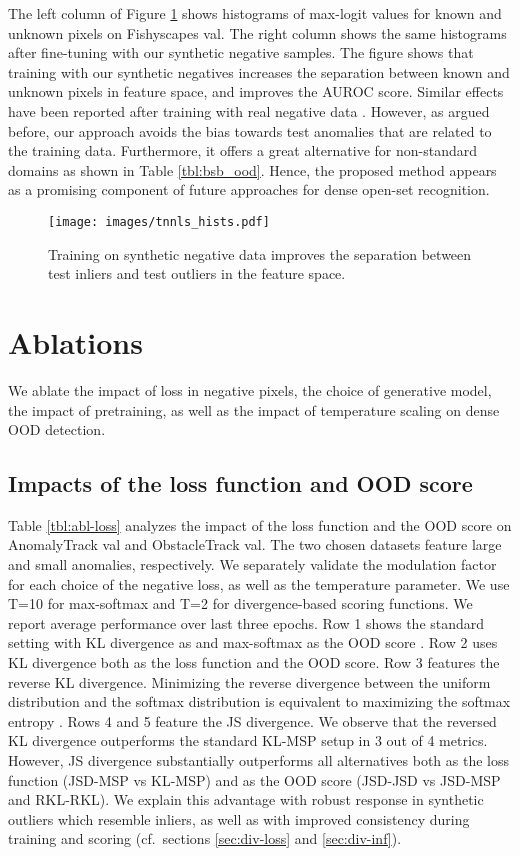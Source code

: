 \documentclass[lettersize,journal,hidelinks]{IEEEtran}
\begin{document}
The left column of Figure \ref{fig:syn_ft_ml} shows histograms of max-logit values for known and unknown pixels on Fishyscapes val.
The right column shows the same histograms after fine-tuning with our synthetic negative samples.
The figure shows that training with our synthetic negatives
increases the separation between 
known and unknown pixels in feature space, 
and improves the AUROC score.
Similar effects have been reported
after training with real negative data \cite{neal18eccv,kong22tpami}.
However, as argued before, our approach avoids
the bias towards test anomalies 
that are related to the training data.
Furthermore, it offers a great alternative
for non-standard domains as shown in Table \ref{tbl:bsb_ood}. 
Hence, the proposed method appears as
a promising component of future approaches for dense open-set recognition.
\begin{figure}[ht]
    \centering
    \texttt{[image: images/tnnls\_hists.pdf]}
    \caption{
    Training on synthetic negative data improves the separation between test inliers and test outliers in the feature space.}
    \label{fig:syn_ft_ml}
\end{figure}

\section{Ablations}

We ablate the impact of loss in negative pixels, the choice of generative model, the impact of pretraining, as well as the impact of temperature scaling on dense OOD detection.

\subsection{Impacts of the loss function and OOD score}
\label{sec:abl}
Table \ref{tbl:abl-loss} analyzes the impact of the loss function  and the OOD score  on AnomalyTrack val and ObstacleTrack val. 
The two chosen datasets feature large and small anomalies, respectively.
We separately validate the modulation factor  for each choice of the negative loss, as well as the temperature parameter.
We use T=10 for max-softmax and T=2 for divergence-based scoring functions.
We report average performance over last three epochs.
Row 1 shows the standard setting with KL divergence as  and max-softmax as the OOD score \cite{lee18iclr,hendrycks19iclr}.
Row 2 uses KL divergence both as the loss function and the OOD score.
Row 3 features the reverse KL divergence. 
Minimizing the reverse divergence between the uniform distribution and the softmax distribution is equivalent to maximizing the softmax entropy \cite{chan21iccv}.
Rows 4 and 5 feature the JS divergence.
We observe that the reversed KL divergence outperforms the standard KL-MSP setup in 3 out of 4 metrics.
However, JS divergence substantially outperforms all alternatives both as the loss function (JSD-MSP vs KL-MSP) and as the OOD score (JSD-JSD vs JSD-MSP and RKL-RKL).
We explain this advantage with robust response in synthetic outliers which resemble inliers, as well as with improved consistency during training and scoring (cf.\ sections \ref{sec:div-loss} and \ref{sec:div-inf}).
\end{document}

